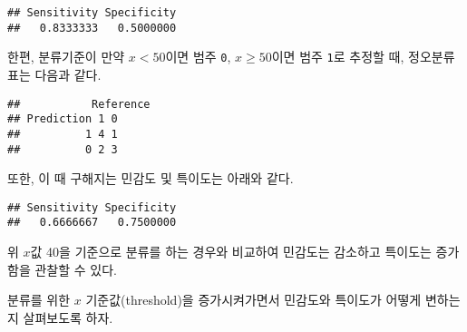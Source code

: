 \documentclass[]{book}
\newenvironment{Shaded}{\begin{snugshade}}{\end{snugshade}}
\newcommand{\DataTypeTok}[1]{\textcolor[rgb]{0.13,0.29,0.53}{#1}}
\newcommand{\DecValTok}[1]{\textcolor[rgb]{0.00,0.00,0.81}{#1}}
\newcommand{\KeywordTok}[1]{\textcolor[rgb]{0.13,0.29,0.53}{\textbf{#1}}}
\newcommand{\NormalTok}[1]{#1}
\newcommand{\OperatorTok}[1]{\textcolor[rgb]{0.81,0.36,0.00}{\textbf{#1}}}
\newcommand{\StringTok}[1]{\textcolor[rgb]{0.31,0.60,0.02}{#1}}
\begin{document}
\begin{verbatim}
## Sensitivity Specificity 
##   0.8333333   0.5000000
\end{verbatim}

한편, 분류기준이 만약 \(x < 50\)이면 범주 \texttt{0}, \(x \geq 50\)이면 범주 \texttt{1}로 추정할 때, 정오분류표는 다음과 같다.

\begin{Shaded}
\end{Shaded}

\begin{verbatim}
##           Reference
## Prediction 1 0
##          1 4 1
##          0 2 3
\end{verbatim}

또한, 이 때 구해지는 민감도 및 특이도는 아래와 같다.

\begin{Shaded}
\end{Shaded}

\begin{verbatim}
## Sensitivity Specificity 
##   0.6666667   0.7500000
\end{verbatim}

위 \(x\)값 40을 기준으로 분류를 하는 경우와 비교하여 민감도는 감소하고 특이도는 증가함을 관찰할 수 있다.

분류를 위한 \(x\) 기준값(threshold)을 증가시켜가면서 민감도와 특이도가 어떻게 변하는 지 살펴보도록 하자.
\end{document}
